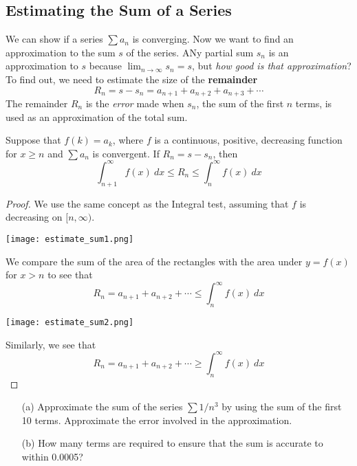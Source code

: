   \subsection*{Estimating the Sum of a Series}
    We can show if a series $\sum a_n$ is converging. Now we want to find an approximation to the sum $s$ of the series. ANy partial sum $s_n$ is an approximation to $s$ because $\lim_{n\to\infty} s_n = s$, but \textit{how good is that approximation}? To find out, we need to estimate the size of the \textbf{remainder}
    $$R_n = s - s_n = a_{n+1} + a_{n+2} + a_{n+3} + \cdots $$
    The remainder $R_n$ is the \textit{error} made when $s_n$, the sum of the first $n$ terms, is used as an approximation of the total sum.
    \begin{definition}
      Suppose that $f(k) = a_k$, where $f$ is a continuous, positive, decreasing function for $x\geq n$ and $\sum a_n$ is convergent. If $R_n = s - s_n$, then
      $$ \int_{n+1}^{\infty} f(x)\ dx \leq R_n \leq \int_{n}^{\infty} f(x)\ dx$$
    \end{definition}
    \begin{proof}\let\qed\relax
      We use the same concept as the Integral test, assuming that $f$ is decreasing on $[n,\infty)$.
      \begin{center}
        \texttt{[image: estimate\_sum1.png]}
      \end{center}
      We compare the sum of the area of the rectangles with the area under $y=f(x)$ for $x>n$ to see that
      $$ R_n = a_{n+1} + a_{n+2} + \cdots \leq \int_{n}^{\infty} f(x)\ dx$$
      \begin{center}
        \texttt{[image: estimate\_sum2.png]}
      \end{center}
      Similarly, we see that
      $$ R_n = a_{n+1} + a_{n+2} + \cdots \geq \int_{n}^{\infty} f(x)\ dx$$
    \end{proof}
    \begin{example}
      \begin{enumerate}
        \item[(a)] Approximate the sum of the series $\sum 1/n^3$ by using the sum of the first 10 terms. Approximate the error involved in the approximation.
        \item[(b)] How many terms are required to ensure that the sum is accurate to within 0.0005?
      \end{enumerate}
    \end{example}
